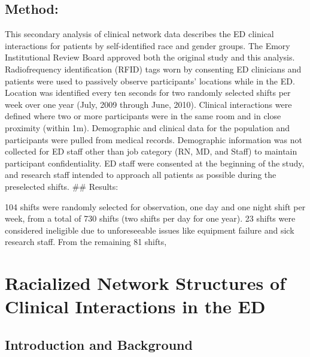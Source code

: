 \documentclass[
]{article}
\begin{document}
\hypertarget{method}{%
\subsection{Method:}\label{method}}

This secondary analysis of clinical network data describes the ED
clinical interactions for patients by self-identified race and gender
groups. The Emory Institutional Review Board approved both the original
study and this analysis. Radiofrequency identification (RFID) tags worn
by consenting ED clinicians and patients were used to passively observe
participants' locations while in the ED. Location was identified every
ten seconds for two randomly selected shifts per week over one year
(July, 2009 through June, 2010). Clinical interactions were defined
where two or more participants were in the same room and in close
proximity (within 1m). Demographic and clinical data for the population
and participants were pulled from medical records. Demographic
information was not collected for ED staff other than job category (RN,
MD, and Staff) to maintain participant confidentiality. ED staff were
consented at the beginning of the study, and research staff intended to
approach all patients as possible during the preselected shifts. \#\#
Results:

104 shifts were randomly selected for observation, one day and one night
shift per week, from a total of 730 shifts (two shifts per day for one
year). 23 shifts were considered ineligible due to unforeseeable issues
like equipment failure and sick research staff. From the remaining 81
shifts,

\hypertarget{racialized-network-structures-of-clinical-interactions-in-the-ed}{%
\section{Racialized Network Structures of Clinical Interactions in the
ED}\label{racialized-network-structures-of-clinical-interactions-in-the-ed}}

\hypertarget{introduction-and-background}{%
\subsection{Introduction and
Background}\label{introduction-and-background}}
\end{document}
